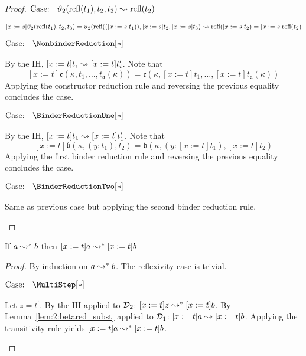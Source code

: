 \begin{proof}
    $\text{Case: }\begin{array}{c} \vartheta_2(\text{refl}(t_1), t_2, t_3) \leadsto \text{refl}(t_2) \end{array}$
    \begin{proofcase}
        $[x := s]\vartheta_2(\text{refl}(t_1), t_2, t_3) = \vartheta_2(\text{refl}(([x := s]t_1)), [x := s]t_2, [x := s]t_3) \leadsto \text{refl}([x := s]t_2) = [x := s]\text{refl}(t_2)$
    \end{proofcase}

    $\text{Case: }\begin{array}{c} \NonbinderReduction[*] \end{array}$
    \begin{proofcase}
        By the IH, $[x := t]t_i \leadsto [x := t]t_i^\prime$.
        Note that $$[x := t]\mathfrak{c}(\kappa, t_1, \ldots, t_{\mathfrak{a}}(\kappa)) = \mathfrak{c}(\kappa, [x := t]t_1, \ldots, [x := t]t_{\mathfrak{a}}(\kappa))$$
        Applying the constructor reduction rule and reversing the previous equality concludes the case.
    \end{proofcase}

    $\text{Case: }\begin{array}{c} \BinderReductionOne[*] \end{array}$
    \begin{proofcase}
        By the IH, $[x := t]t_1 \leadsto [x := t]t_1^\prime$.
        Note that $$[x := t]\mathfrak{b}(\kappa, (y : t_1), t_2) = \mathfrak{b}(\kappa, (y : [x := t]t_1), [x := t]t_2)$$
        Applying the first binder reduction rule and reversing the previous equality concludes the case.
    \end{proofcase}

    $\text{Case: }\begin{array}{c} \BinderReductionTwo[*] \end{array}$
    \begin{proofcase}
        Same as previous case but applying the second binder reduction rule.
    \end{proofcase}
\end{proof}

\begin{lemma}
    If $a \leadsto^* b$ then $[x := t]a \leadsto^* [x := t]b$
    \label{lem:2:betastar_subst}
\end{lemma}
\begin{proof}
    By induction on $a \leadsto^* b$.
    The reflexivity case is trivial.

    $\text{Case: }\begin{array}{c} \MultiStep[*] \end{array}$
    \begin{proofcase}
        Let $z = t^\prime$.
        By the IH applied to $\mathcal{D}_{2}$: $[x := t]z \leadsto^* [x := t]b$.
        By Lemma~\ref{lem:2:betared_subst} applied to $\mathcal{D}_{1}$: $[x := t]a \leadsto [x := t]b$.
        Applying the transitivity rule yields $[x := t]a \leadsto^* [x := t]b$.
    \end{proofcase}
\end{proof}

